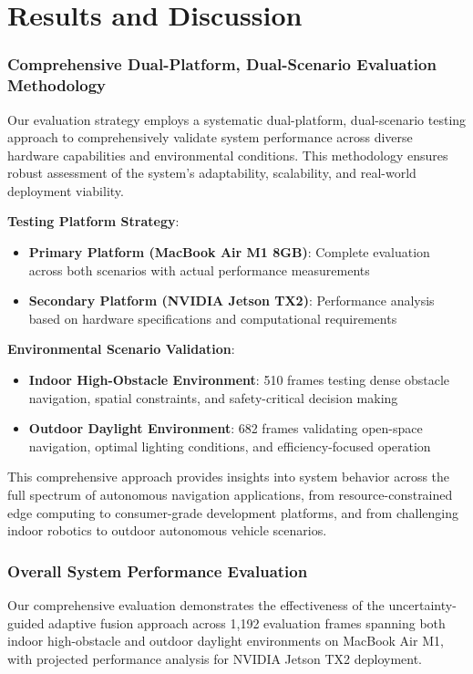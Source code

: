 \documentclass[12pt,oneside]{book}
\begin{document}
\chapter{Results and Discussion}

\subsection{Comprehensive Dual-Platform, Dual-Scenario Evaluation Methodology}

Our evaluation strategy employs a systematic dual-platform, dual-scenario testing approach to comprehensively validate system performance across diverse hardware capabilities and environmental conditions. This methodology ensures robust assessment of the system's adaptability, scalability, and real-world deployment viability.

\textbf{Testing Platform Strategy}:
\begin{itemize}
\item \textbf{Primary Platform (MacBook Air M1 8GB)}: Complete evaluation across both scenarios with actual performance measurements
\item \textbf{Secondary Platform (NVIDIA Jetson TX2)}: Performance analysis based on hardware specifications and computational requirements
\end{itemize}

\textbf{Environmental Scenario Validation}:
\begin{itemize}
\item \textbf{Indoor High-Obstacle Environment}: 510 frames testing dense obstacle navigation, spatial constraints, and safety-critical decision making
\item \textbf{Outdoor Daylight Environment}: 682 frames validating open-space navigation, optimal lighting conditions, and efficiency-focused operation
\end{itemize}

This comprehensive approach provides insights into system behavior across the full spectrum of autonomous navigation applications, from resource-constrained edge computing to consumer-grade development platforms, and from challenging indoor robotics to outdoor autonomous vehicle scenarios.

\subsection{Overall System Performance Evaluation}

Our comprehensive evaluation demonstrates the effectiveness of the uncertainty-guided adaptive fusion approach across 1,192 evaluation frames spanning both indoor high-obstacle and outdoor daylight environments on MacBook Air M1, with projected performance analysis for NVIDIA Jetson TX2 deployment.
\end{document}
